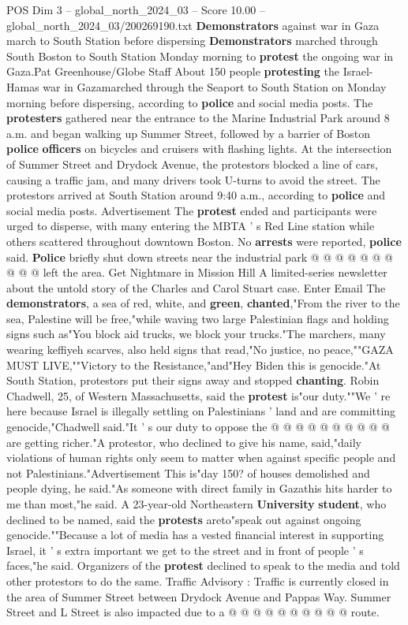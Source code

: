 \begin{textsample}{POS Dim 3 – global\_north\_2024\_03 – Score 10.00 – global\_north\_2024\_03/200269190.txt}  \label{ex:f3_pos_297}
\textbf{Demonstrators} against war in Gaza march to South Station before dispersing \textbf{Demonstrators} marched through South Boston to South Station Monday morning to \textbf{protest} the ongoing war in Gaza.Pat Greenhouse/Globe Staff About 150 people \textbf{protesting} the Israel-Hamas war in Gazamarched through the Seaport to South Station on Monday morning before dispersing, according to \textbf{police} and social media posts.
The \textbf{protesters} gathered near the entrance to the Marine Industrial Park around 8 a.m. and began walking up Summer Street, followed by a barrier of Boston \textbf{police} \textbf{officers} on bicycles and cruisers with flashing lights.
At the intersection of Summer Street and Drydock Avenue, the protestors blocked a line of cars, causing a traffic jam, and many drivers took U-turns to avoid the street.
The protestors arrived at South Station around 9:40 a.m., according to \textbf{police} and social media posts.
Advertisement The \textbf{protest} ended and participants were urged to disperse, with many entering the MBTA ' s Red Line station while others scattered throughout downtown Boston.
No \textbf{arrests} were reported, \textbf{police} said. \textbf{Police} briefly shut down streets near the industrial park @ @ @ @ @ @ @ @ @ @ left the area.
Get Nightmare in Mission Hill A limited-series newsletter about the untold story of the Charles and Carol Stuart case.
Enter Email The \textbf{demonstrators}, a sea of red, white, and \textbf{green}, \textbf{chanted},"From the river to the sea, Palestine will be free,"while waving two large Palestinian flags and holding signs such as"You block aid trucks, we block your trucks."The marchers, many wearing keffiyeh scarves, also held signs that read,"No justice, no peace,""GAZA MUST LIVE,""Victory to the Resistance,"and"Hey Biden this is genocide."At South Station, protestors put their signs away and stopped \textbf{chanting}.
Robin Chadwell, 25, of Western Massachusetts, said the \textbf{protest} is"our duty.""We ' re here because Israel is illegally settling on Palestinians ' land and are committing genocide,"Chadwell said."It ' s our duty to oppose the @ @ @ @ @ @ @ @ @ @ are getting richer."A protestor, who declined to give his name, said,"daily violations of human rights only seem to matter when against specific people and not Palestinians."Advertisement This is"day 150? of houses demolished and people dying, he said."As someone with direct family in Gazathis hits harder to me than most,"he said.
A 23-year-old Northeastern \textbf{University} \textbf{student}, who declined to be named, said the \textbf{protests} areto"speak out against ongoing genocide.""Because a lot of media has a vested financial interest in supporting Israel, it ' s extra important we get to the street and in front of people ' s faces,"he said.
Organizers of the \textbf{protest} declined to speak to the media and told other protestors to do the same.
Traffic Advisory : Traffic is currently closed in the area of Summer Street between Drydock Avenue and Pappas Way.
Summer Street and L Street is also impacted due to a @ @ @ @ @ @ @ @ @ @ route.


\end{textsample}
